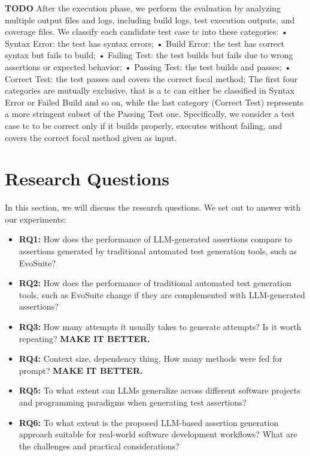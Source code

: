 \textbf{TODO\cite{}}
After the execution phase, we perform the evaluation by analyzing multiple output files and logs, including build logs, test execution outputs, and coverage files. We classify each candidate test case tc into these categories: 
• Syntax Error: the test has syntax errors; 
• Build Error: the test has correct syntax but fails to build; 
• Failing Test: the test builds but fails due to wrong assertions or expected behavior; 
• Passing Test: the test builds and passes; 
• Correct Test: the test passes and covers the correct focal method; The first four categories are mutually exclusive, that is a tc can either be classified in Syntax Error or Failed Build and so on, while the last category (Correct Test) represents a more stringent subset of the Passing Test one. Specifically, we consider a test case tc to be correct only if it builds properly, executes without failing, and covers the correct focal method given as input.

\section{Research Questions}
\label{sec:research_questions}
\vspace{0.2 cm}

In this section, we will discuss the research questions. We set out to answer with our experiments:
\begin{itemize}
    \item \textbf{RQ1:} How does the performance of LLM-generated assertions compare to assertions generated by traditional automated test generation tools, such as EvoSuite?

    \item \textbf{RQ2:} How does the performance of traditional automated test generation tools, such as EvoSuite change if they are complemented with LLM-generated assertions?
    
    \item \textbf{RQ3:} How many attempts it usually takes to generate attempts? Is it worth repeating?
    \textbf{MAKE IT BETTER.}

    \item \textbf{RQ4:} Context size, dependency thing, How many methods were fed for prompt?
    \textbf{MAKE IT BETTER.}
    
    \item \textbf{RQ5:} To what extent can LLMs generalize across different software projects and programming paradigms when generating test assertions?
    
    \item \textbf{RQ6:} To what extent is the proposed LLM-based assertion generation approach suitable for real-world software development workflows? What are the challenges and practical considerations?
\end{itemize}


